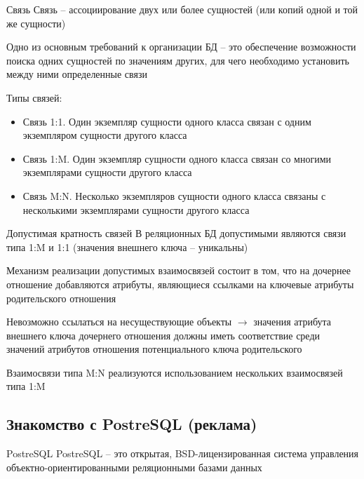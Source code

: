 \documentclass[12pt]{article}
\begin{document}
\begin{defin}{Связь}
    Связь -- ассоциирование двух или более сущностей (или копий одной и той же сущности)

    Одно из основным требований к организации БД -- это обеспечение возможности поиска одних сущностей по значениям других, для чего необходимо установить между ними определенные связи 

    Типы связей:

    \begin{itemize}
        \item Связь 1:1. Один экземпляр сущности одного класса связан с одним экземпляром сущности другого класса
        \item Связь 1:M. Один экземпляр сущности одного класса связан со многими экземплярами сущности другого класса 
        \item Связь M:N. Несколько экземпляров сущности одного класса связаны с несколькими экземплярами сущности другого класса
    \end{itemize}
\end{defin}

\begin{nota}{Допустимая кратность связей}
    В реляционных БД допустимыми являются связи типа 1:M и 1:1 (значения внешнего ключа -- уникальны)

    Механизм реализации допустимых взаимосвязей состоит в том, что на дочернее отношение добавляются атрибуты, являющиеся ссылками на ключевые атрибуты родительского отношения 

    Невозможно ссылаться на несуществующие объекты $\to$ значения атрибута внешнего ключа дочернего отношения должны иметь соответствие среди значений атрибутов отношения потенциального ключа родительского

    Взаимосвязи типа M:N реализуются использованием нескольких взаимосвязей типа 1:M
\end{nota}

\newpage

\subsection{Знакомство с PostreSQL (реклама)}

\begin{defin}{PostreSQL}
    PostreSQL -- это открытая, BSD-лицензированная система управления объектно-ориентированными реляционными базами данных 
\end{defin}
\end{document}
